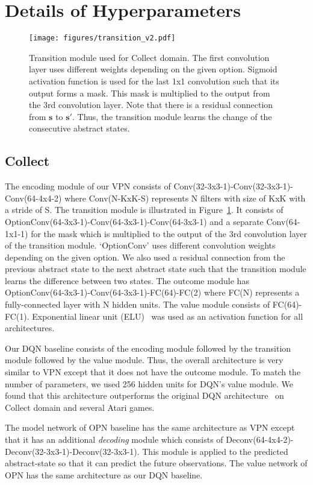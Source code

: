 \documentclass{article}
\begin{document}
\clearpage
\section{Details of Hyperparameters}
\begin{figure}[h]
\centering
\texttt{[image: figures/transition\_v2.pdf]}
\caption{Transition module used for Collect domain. The first convolution layer uses different weights depending on the given option. Sigmoid activation function is used for the last 1x1 convolution such that its output forms a mask. This mask is multiplied to the output from the 3rd convolution layer. Note that there is a residual connection from $\textbf{s}$ to $\textbf{s}'$. Thus, the transition module learns the change of the consecutive abstract states. }
\label{fig:transition}
\end{figure}
\subsection{Collect}
The encoding module of our VPN consists of Conv(32-3x3-1)-Conv(32-3x3-1)-Conv(64-4x4-2) where Conv(N-KxK-S) represents N filters with size of KxK with a stride of S. The transition module is illustrated in Figure~\ref{fig:transition}. It consists of OptionConv(64-3x3-1)-Conv(64-3x3-1)-Conv(64-3x3-1) and a separate Conv(64-1x1-1) for the mask which is multiplied to the output of the 3rd convolution layer of the transition module. `OptionConv' uses different convolution weights depending on the given option. We also used a residual connection from the previous abstract state to the next abstract state such that the transition module learns the difference between two states. The outcome module has OptionConv(64-3x3-1)-Conv(64-3x3-1)-FC(64)-FC(2) where FC(N) represents a fully-connected layer with N hidden units. The value module consists of FC(64)-FC(1). Exponential linear unit (ELU)~\citep{Clevert2015FastAA} was used as an activation function for all architectures.

Our DQN baseline consists of the encoding module followed by the transition module followed by the value module. Thus, the overall architecture is very similar to VPN except that it does not have the outcome module. To match the number of parameters, we used 256 hidden units for DQN's value module. We found that this architecture outperforms the original DQN architecture~\citep{mnih2015human} on Collect domain and several Atari games.

The model network of OPN baseline has the same architecture as VPN except that it has an additional \textit{decoding} module which consists of Deconv(64-4x4-2)-Deconv(32-3x3-1)-Deconv(32-3x3-1). This module is applied to the predicted abstract-state so that it can predict the future observations. The value network of OPN has the same architecture as our DQN baseline.
\end{document}
